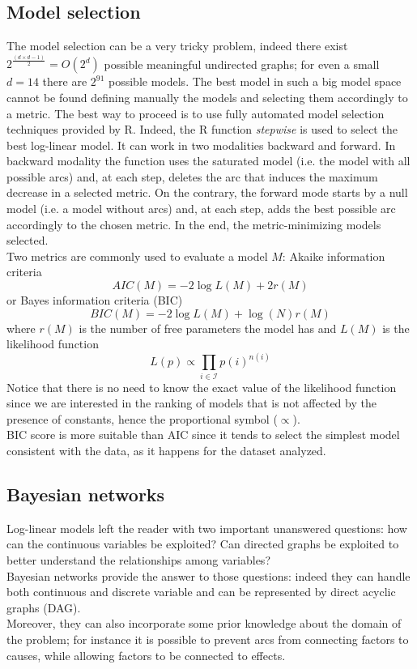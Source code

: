 \documentclass{article}
\begin{document}
\subsection{Model selection}
The model selection can be a very tricky problem, indeed there exist $2^{\frac{(d \times d-1)}{2}} = O(2^{d})$ possible meaningful undirected graphs; for even a small $d = 14$ there are $2^{91}$ possible models. The best model in such a big model space cannot be found defining manually the models and selecting them accordingly to a metric. The best way to proceed is to use fully automated model selection techniques provided by R. Indeed, the R function \textit{stepwise} is used to select the best log-linear model.
It can work in two modalities backward and forward. In backward modality the function uses the saturated model (i.e. the model with all possible arcs) and, at each step, deletes the arc that induces the maximum decrease in a selected metric. On the contrary, the forward mode starts by a null model (i.e. a model without arcs) and, at each step, adds the best possible arc accordingly to the chosen metric. In the end, the metric-minimizing models selected. \\
Two metrics are commonly used to evaluate a model $M$: Akaike information criteria \begin{equation}
   AIC(M) =  -2 \log L(M) + 2r(M) 
\end{equation}
or Bayes information criteria (BIC)
\begin{equation}
   BIC(M) =  -2 \log L(M) + \log(N) r(M) 
\end{equation}
where $r(M)$ is the number of free parameters the model has and $L(M)$ is the likelihood function
\begin{equation}
    L(p) \propto  \prod\limits_{i \in \mathcal{I}}p(i)^{n(i)}
\end{equation}
Notice that there is no need to know the exact value of the likelihood function since we are interested in the ranking of models that is not affected by the presence of constants, hence the proportional symbol ($\propto$). \\
BIC score is more suitable than AIC since it tends to select the simplest model consistent with the data, as it happens for the dataset analyzed.


\subsection{Bayesian networks}
Log-linear models left the reader with two important unanswered questions: how can the continuous variables be exploited? Can directed graphs be exploited to better understand the relationships among variables? \\
Bayesian networks provide the answer to those questions: indeed they can handle both continuous and discrete variable and can be represented by direct acyclic graphs (DAG). \\
Moreover, they can also incorporate some prior knowledge about the domain of the problem; for instance it is possible to prevent arcs from connecting factors to causes, while allowing factors to be connected to effects.\\
\end{document}
